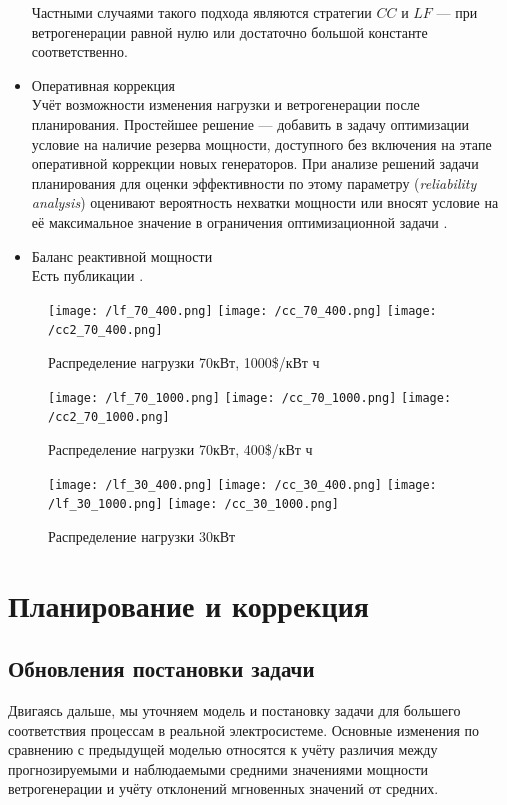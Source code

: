 \begin{itemize}
    Частными случаями такого подхода являются стратегии $CC$ и $LF$ --- при ветрогенерации равной нулю или достаточно большой константе соответственно.
    
    
    \item Оперативная коррекция\\
    Учёт возможности изменения нагрузки и ветрогенерации после планирования. 
    Простейшее решение --- добавить в задачу оптимизации условие на наличие резерва мощности, доступного без включения на этапе оперативной коррекции новых генераторов.
    При анализе решений задачи планирования для оценки эффективности по этому параметру (\textit{reliability analysis}) оценивают вероятность нехватки мощности \cite[8]{Sufyan2019} или вносят условие на её максимальное значение в ограничения оптимизационной задачи \cite[5]{Petersen2018}.
    
    \item Баланс реактивной мощности\\
    Есть публикации \cite{zhang2016reactive}.
    
\end{itemize}

\begin{figure}[]
\texttt{[image: /lf\_70\_400.png]}
\texttt{[image: /cc\_70\_400.png]}
\texttt{[image: /cc2\_70\_400.png]}
\centering
\caption{Распределение нагрузки 70кВт, 1000\$/кВт ч}
\label{fig:res_70_400}
\end{figure}

\begin{figure}[]
\texttt{[image: /lf\_70\_1000.png]}
\texttt{[image: /cc\_70\_1000.png]}
\texttt{[image: /cc2\_70\_1000.png]}
\caption{Распределение нагрузки 70кВт, 400\$/кВт ч}
\label{fig:res_70_1000}
\end{figure}

\begin{figure}[]
\texttt{[image: /lf\_30\_400.png]}
\texttt{[image: /cc\_30\_400.png]}
\texttt{[image: /lf\_30\_1000.png]}
\texttt{[image: /cc\_30\_1000.png]}
\caption{Распределение нагрузки 30кВт}
\label{fig:res_30}
\end{figure}


\section{Планирование и коррекция}
\subsection{Обновления постановки задачи}
    Двигаясь дальше, мы уточняем модель и постановку задачи для большего соответствия процессам в реальной электросистеме.
    Основные изменения по сравнению с предыдущей моделью относятся к учёту различия между прогнозируемыми и наблюдаемыми средними значениями мощности ветрогенерации и учёту отклонений мгновенных значений от средних. 
    
